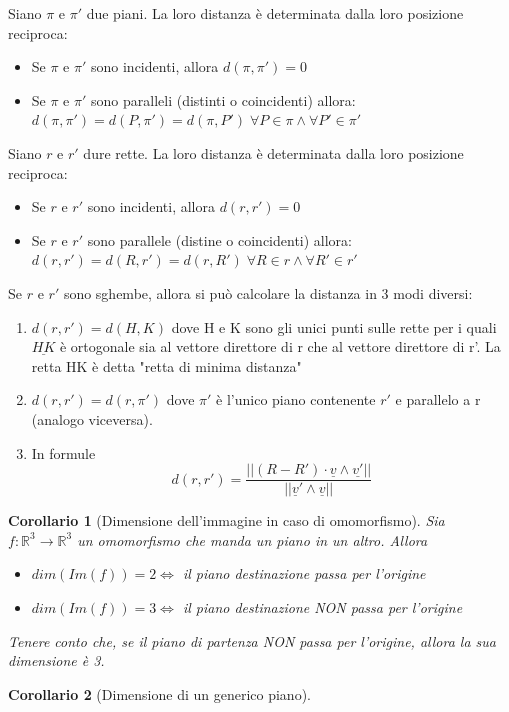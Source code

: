 \documentclass[12pt]{article}
\newenvironment{para}{\begin{adjustwidth}{13mm}{}}{\end{adjustwidth}}
\newtheorem{Corollario}{Corollario}[subsection]
\begin{document}
\begin{para}
\begin{itemize}
\end{itemize}
Siano $\pi$ e $\pi'$ due piani. La loro distanza è determinata dalla loro posizione reciproca:
\begin{itemize}
    \item Se $\pi$ e $\pi'$ sono incidenti, allora $d(\pi, \pi') = 0$
    \item Se $\pi$ e $\pi'$ sono paralleli (distinti o coincidenti) allora: $d(\pi, \pi') = d(P, \pi') = d(\pi, P') \; \forall P \in \pi \land \forall P' \in \pi'$
\end{itemize}
Siano $r$ e $r'$ dure rette. La loro distanza è determinata dalla loro posizione reciproca:
\begin{itemize}
    \item Se $r$ e $r'$ sono incidenti, allora $d(r, r')=0$
    \item Se $r$ e $r'$ sono parallele (distine o coincidenti) allora: $d(r, r')=d(R, r')=d(r, R') \; \forall R\in r \land \forall R' \in r'$
\end{itemize}
Se $r$ e $r'$ sono sghembe, allora si può calcolare la distanza in 3 modi diversi:
\begin{enumerate}
    \item $d(r, r')=d(H, K)$ dove H e K sono gli unici punti sulle rette per i quali $\underline{HK}$ è ortogonale sia al vettore direttore di r che al vettore direttore di r'. La retta HK è detta "retta di minima distanza"
    \item $d(r, r') = d(r, \pi')$ dove $\pi'$ è l'unico piano contenente $r'$ e parallelo a r (analogo viceversa).
    \item In formule $$d(r, r')=\frac{\bigl||(R-R')\cdot \underline{v} \land \underline{v'}|\bigr|}{\bigl||\underline{v}'\land \underline{v}|\bigr|}$$
\end{enumerate}
\begin{Corollario}[Dimensione dell'immagine in caso di omomorfismo]
Sia $f:\mathbb{R}^3 \rightarrow \mathbb{R}^3$ un omomorfismo che manda un piano in un altro. Allora \begin{itemize}
    \item $dim(Im(f)) = 2 \Leftrightarrow$ il piano destinazione passa per l'origine
    \item $dim(Im(f)) = 3 \Leftrightarrow$ il piano destinazione NON passa per l'origine
\end{itemize}
Tenere conto che, se il piano di partenza NON passa per l'origine, allora la sua dimensione è 3.
\end{Corollario}
\begin{Corollario}[Dimensione di un generico piano]

\end{Corollario}
\end{para}
\end{document}
